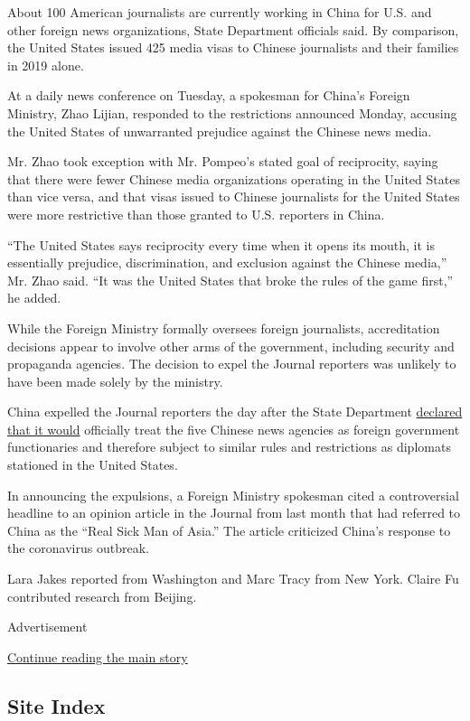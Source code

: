 About 100 American journalists are currently working in China for U.S.
and other foreign news organizations, State Department officials said.
By comparison, the United States issued 425 media visas to Chinese
journalists and their families in 2019 alone.

At a daily news conference on Tuesday, a spokesman for China's Foreign
Ministry, Zhao Lijian, responded to the restrictions announced Monday,
accusing the United States of unwarranted prejudice against the Chinese
news media.

Mr. Zhao took exception with Mr. Pompeo's stated goal of reciprocity,
saying that there were fewer Chinese media organizations operating in
the United States than vice versa, and that visas issued to Chinese
journalists for the United States were more restrictive than those
granted to U.S. reporters in China.

``The United States says reciprocity every time when it opens its mouth,
it is essentially prejudice, discrimination, and exclusion against the
Chinese media,'' Mr. Zhao said. ``It was the United States that broke
the rules of the game first,'' he added.

While the Foreign Ministry formally oversees foreign journalists,
accreditation decisions appear to involve other arms of the government,
including security and propaganda agencies. The decision to expel the
Journal reporters was unlikely to have been made solely by the ministry.

China expelled the Journal reporters the day after the State Department
\href{https://www.nytimes3xbfgragh.onion/2020/02/18/world/asia/china-media-trump.html}{declared
that it would} officially treat the five Chinese news agencies as
foreign government functionaries and therefore subject to similar rules
and restrictions as diplomats stationed in the United States.

In announcing the expulsions, a Foreign Ministry spokesman cited a
controversial headline to an opinion article in the Journal from last
month that had referred to China as the ``Real Sick Man of Asia.'' The
article criticized China's response to the coronavirus outbreak.

Lara Jakes reported from Washington and Marc Tracy from New York. Claire
Fu contributed research from Beijing.

Advertisement

\protect\hyperlink{after-bottom}{Continue reading the main story}

\hypertarget{site-index}{%
\subsection{Site Index}\label{site-index}}

